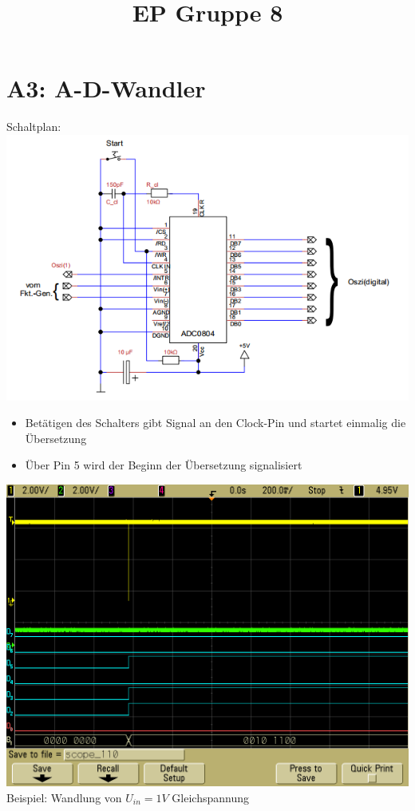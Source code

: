 \documentclass[compress,11pt]{beamer}
\title{EP Gruppe 8}
\begin{document}
\section{A3: A-D-Wandler}
\begin{frame}
Schaltplan:\\
\includegraphics[width=.7\textwidth]{schalt3}\\



\end{frame}
\begin{frame}

\begin{itemize}

\item Betätigen des Schalters gibt Signal an den Clock-Pin und startet einmalig die Übersetzung
\item Über Pin 5 wird der Beginn der Übersetzung signalisiert
\end{itemize}
\end{frame}
\begin{frame}
\includegraphics[width=.7\textwidth]{../vales_zeug/scope_110}\\
Beispiel: Wandlung von $U_{in} = 1 V$ Gleichspannung
\end{frame}
\end{document}
